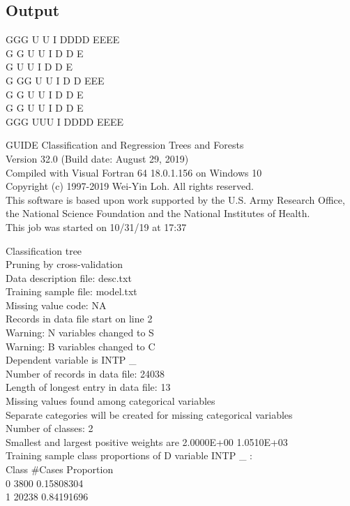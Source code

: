 \documentclass[12pt]{article}
\begin{document}
\subsection{Output}
             GGG   U   U  I  DDDD   EEEE\\
            G   G  U   U  I  D   D  E\\
            G      U   U  I  D   D  E\\
            G  GG  U   U  I  D   D  EEE\\
            G   G  U   U  I  D   D  E\\
            G   G  U   U  I  D   D  E\\
             GGG    UUU   I  DDDD   EEEE
   
 GUIDE Classification and Regression Trees and Forests\\
 Version 32.0 (Build date: August 29, 2019)        \\
 Compiled with Visual Fortran 64 18.0.1.156 on Windows 10\\              
 Copyright (c) 1997-2019 Wei-Yin Loh. All rights reserved.\\
 This software is based upon work supported by the U.S. Army Research Office,\\
 the National Science Foundation and the National Institutes of Health.\\
  
 This job was started on 10/31/19 at 17:37
  
 Classification tree\\
 Pruning by cross-validation\\
 Data description file: desc.txt\\
 Training sample file: model.txt\\
 Missing value code: NA\\
 Records in data file start on line 2\\
 Warning: N variables changed to S\\
 Warning: B variables changed to C\\
 Dependent variable is INTP \_ \\
 Number of records in data file: 24038\\
 Length of longest entry in data file: 13\\
 Missing values found among categorical variables\\
 Separate categories will be created for missing categorical variables\\
 Number of classes: 2\\
 Smallest and largest positive weights are  2.0000E+00 1.0510E+03\\
 Training sample class proportions of D variable INTP \_ :\\
 Class  \#Cases     Proportion\\
 0        3800     0.15808304\\
 1       20238     0.84191696
  
\end{document}
